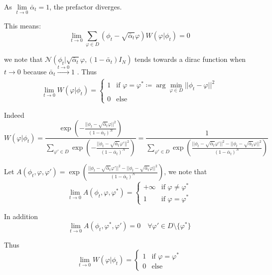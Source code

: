 \documentclass[a4paper,10pt]{article}
\theoremstyle{definition} %
\theoremstyle{definition} %
\theoremstyle{definition} %
\theoremstyle{definition} %
\begin{document}
As  $\lim\limits_{t \to 0} \bar{\alpha}_t = 1$, the prefactor diverges.

This means:
\begin{equation*}
    \lim\limits_{t \to 0} \sum\limits_{\varphi \in D} (\phi_t - \sqrt{\bar{\alpha}_t} \varphi) W(\varphi | \phi_t) = 0
\end{equation*}


we note that $\mathcal{N}(\phi_t | \sqrt{\bar{\alpha}_t} \varphi, (1 - \bar{\alpha}_t) I_N)$ tends towards a dirac function when $t \to 0$ because $\bar{\alpha}_t \xrightarrow[]{t \to 0} 1$ .
Thus
\begin{equation*}
    \lim\limits_{t \to 0} W(\varphi | \phi_t) =
\begin{cases} 
1 & \text{if } \varphi = \varphi^* \coloneq \arg\min_{\varphi \in D} ||\phi_t - \varphi||^2 \\
0 & \text{else}
\end{cases}
\end{equation*}

Indeed
\begin{equation*}
    W(\varphi | \phi_t) =
\frac{\exp\left( -\frac{||\phi_t - \sqrt{\bar{\alpha}_t} \varphi||^2}{(1 - \bar{\alpha}_t)^N} \right)}
{\sum\limits_{\varphi' \in D} \exp\left( -\frac{||\phi_t - \sqrt{\bar{\alpha}_t} \varphi'||^2}{(1 - \bar{\alpha}_t)^N} \right)}
=\frac{1}{\sum\limits_{\varphi' \in D} \exp\left( \frac{||\phi_t - \sqrt{\bar{\alpha}_t} \varphi'||^2 - ||\phi_t - \sqrt{\bar{\alpha}_t} \varphi||^2}{(1 - \bar{\alpha}_t)^N} \right)}
\end{equation*}

Let $A(\phi_t, \varphi, \varphi' ) = \exp\left( \frac{||\phi_t - \sqrt{\bar{\alpha}_t} \varphi'||^2 - ||\phi_t - \sqrt{\bar{\alpha}_t} \varphi||^2}{(1 - \bar{\alpha}_t)^N} \right)$, we note that
\begin{equation*}
    \lim\limits_{t \to 0} A(\phi_t, \varphi, \varphi^*) =
\begin{cases} 
+\infty & \text{if } \varphi \neq \varphi^* \\
1 & \text{if } \varphi = \varphi^*
\end{cases}
\end{equation*}

In addition
\begin{equation*}
    \lim\limits_{t \to 0} A(\phi_t, \varphi^*, \varphi') = 0 \quad \forall \varphi' \in D \setminus \{\varphi^*\}
\end{equation*}

Thus
\[
\lim\limits_{t \to 0} W(\varphi | \phi_t) =
\begin{cases} 
1 & \text{if } \varphi = \varphi^* \\
0 & \text{else}
\end{cases}
\]
\end{document}
